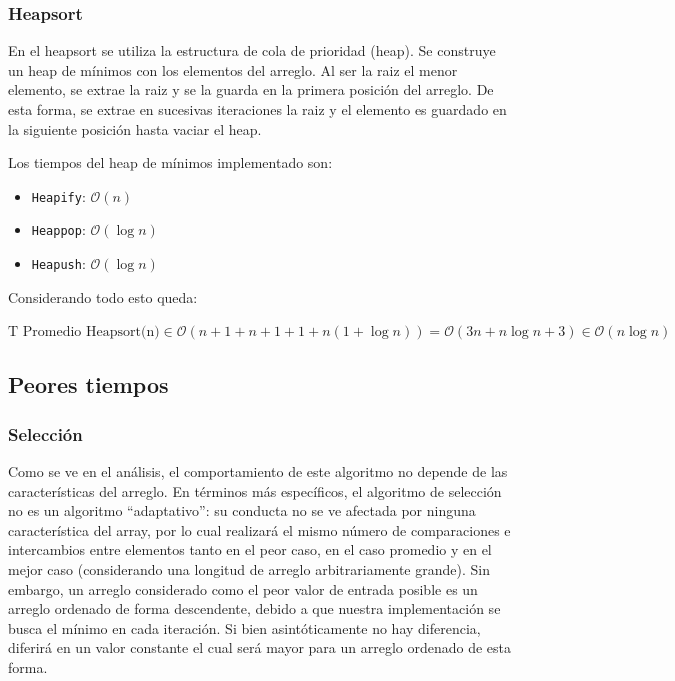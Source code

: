 \documentclass[article,a4paper]{article}
\newcommand{\bigO}{\mathcal{O}}
\begin{document}
\subsubsection{Heapsort}

En el heapsort se utiliza la estructura de cola de prioridad (heap). Se construye un heap de mínimos con los elementos del arreglo. Al ser la raiz el menor elemento, se extrae la raiz y se la guarda en la primera posición del arreglo. De esta forma, se extrae en sucesivas iteraciones la raiz y el elemento es guardado en la siguiente posición hasta vaciar el heap.

Los tiempos del heap de mínimos implementado son:

\begin{itemize}
\item \texttt{Heapify}: $\bigO(n)$
\item \texttt{Heappop}: $\bigO(\log n)$
\item \texttt{Heapush}: $\bigO(\log n)$
\end{itemize}

Considerando todo esto queda:

$\mbox{T Promedio Heapsort(n)} \in \bigO(n + 1 + n + 1 + 1 + n (1 + \log n)) = \bigO(3n + n \log n + 3) \in \bigO(n \log n)$

\subsection{Peores tiempos}

\subsubsection{Selección}

Como se ve en el análisis, el comportamiento de este algoritmo no depende de las características del arreglo. En términos más específicos, el algoritmo de selección no es un algoritmo “adaptativo”: su conducta no se ve afectada por ninguna característica del array, por lo cual realizará el mismo número de comparaciones e intercambios entre elementos tanto en el peor caso, en el caso promedio y en el mejor caso (considerando una longitud de arreglo arbitrariamente grande). Sin embargo, un arreglo considerado como el peor valor de entrada posible es un arreglo ordenado de forma descendente, debido a que nuestra implementación se busca el mínimo en cada iteración. Si bien asintóticamente no hay diferencia, diferirá en un valor constante el cual será mayor para un arreglo ordenado de esta forma.
\end{document}
